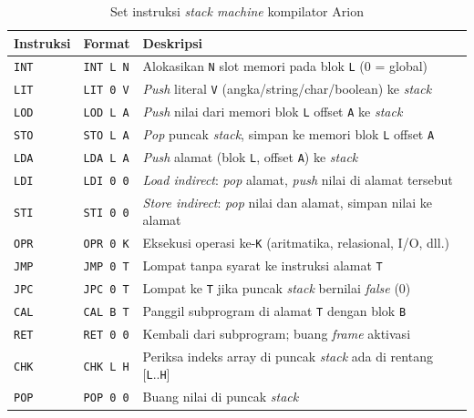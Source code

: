\documentclass[12pt, a4paper]{article}
\begin{document}
\begin{table}[H]
    \centering
    \renewcommand{\arraystretch}{1.3}
    \begin{tabular}{|l|l|p{}|}
        \hline
        \textbf{Instruksi} & \textbf{Format} & \textbf{Deskripsi} \\
        \hline
        \texttt{INT} & \texttt{INT L N} & Alokasikan \texttt{N} slot memori pada blok \texttt{L} (0 = global) \\
        \hline
        \texttt{LIT} & \texttt{LIT 0 V} & \textit{Push} literal \texttt{V} (angka/string/char/boolean) ke \textit{stack} \\
        \hline
        \texttt{LOD} & \texttt{LOD L A} & \textit{Push} nilai dari memori blok \texttt{L} offset \texttt{A} ke \textit{stack} \\
        \hline
        \texttt{STO} & \texttt{STO L A} & \textit{Pop} puncak \textit{stack}, simpan ke memori blok \texttt{L} offset \texttt{A} \\
        \hline
        \texttt{LDA} & \texttt{LDA L A} & \textit{Push} alamat (blok \texttt{L}, offset \texttt{A}) ke \textit{stack} \\
        \hline
        \texttt{LDI} & \texttt{LDI 0 0} & \textit{Load indirect}: \textit{pop} alamat, \textit{push} nilai di alamat tersebut \\
        \hline
        \texttt{STI} & \texttt{STI 0 0} & \textit{Store indirect}: \textit{pop} nilai dan alamat, simpan nilai ke alamat \\
        \hline
        \texttt{OPR} & \texttt{OPR 0 K} & Eksekusi operasi ke-\texttt{K} (aritmatika, relasional, I/O, dll.) \\
        \hline
        \texttt{JMP} & \texttt{JMP 0 T} & Lompat tanpa syarat ke instruksi alamat \texttt{T} \\
        \hline
        \texttt{JPC} & \texttt{JPC 0 T} & Lompat ke \texttt{T} jika puncak \textit{stack} bernilai \textit{false} (0) \\
        \hline
        \texttt{CAL} & \texttt{CAL B T} & Panggil subprogram di alamat \texttt{T} dengan blok \texttt{B} \\
        \hline
        \texttt{RET} & \texttt{RET 0 0} & Kembali dari subprogram; buang \textit{frame} aktivasi \\
        \hline
        \texttt{CHK} & \texttt{CHK L H} & Periksa indeks array di puncak \textit{stack} ada di rentang [\texttt{L}..\texttt{H}] \\
        \hline
        \texttt{POP} & \texttt{POP 0 0} & Buang nilai di puncak \textit{stack} \\
        \hline
    \end{tabular}
    \caption{Set instruksi \textit{stack machine} kompilator Arion}
\end{table}
\end{document}
